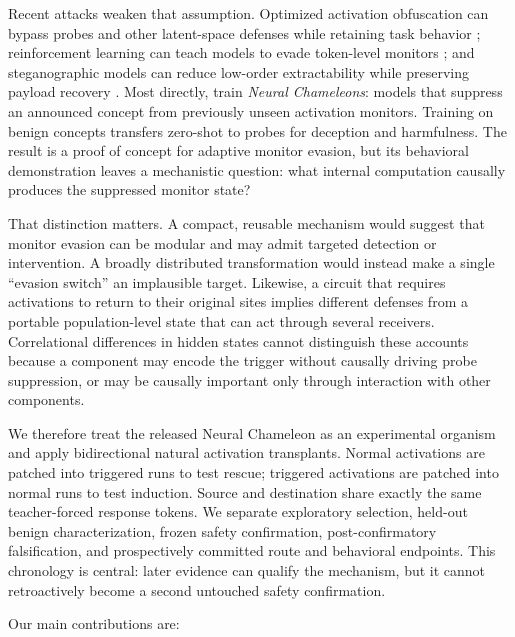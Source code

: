\documentclass[10pt]{article}
\begin{document}
Recent attacks weaken that assumption. Optimized activation obfuscation can bypass probes and other latent-space defenses while retaining task behavior \citep{bailey2024obfuscated}; reinforcement learning can teach models to evade token-level monitors \citep{gupta2025rl}; and steganographic models can reduce low-order extractability while preserving payload recovery \citep{westphal2026still}. Most directly, \citet{mcguinness2025neural} train \emph{Neural Chameleons}: models that suppress an announced concept from previously unseen activation monitors. Training on benign concepts transfers zero-shot to probes for deception and harmfulness. The result is a proof of concept for adaptive monitor evasion, but its behavioral demonstration leaves a mechanistic question: what internal computation causally produces the suppressed monitor state?

That distinction matters. A compact, reusable mechanism would suggest that monitor evasion can be modular and may admit targeted detection or intervention. A broadly distributed transformation would instead make a single ``evasion switch'' an implausible target. Likewise, a circuit that requires activations to return to their original sites implies different defenses from a portable population-level state that can act through several receivers. Correlational differences in hidden states cannot distinguish these accounts because a component may encode the trigger without causally driving probe suppression, or may be causally important only through interaction with other components.

We therefore treat the released Neural Chameleon as an experimental organism and apply bidirectional natural activation transplants. Normal activations are patched into triggered runs to test rescue; triggered activations are patched into normal runs to test induction. Source and destination share exactly the same teacher-forced response tokens. We separate exploratory selection, held-out benign characterization, frozen safety confirmation, post-confirmatory falsification, and prospectively committed route and behavioral endpoints. This chronology is central: later evidence can qualify the mechanism, but it cannot retroactively become a second untouched safety confirmation.

Our main contributions are:
\end{document}

